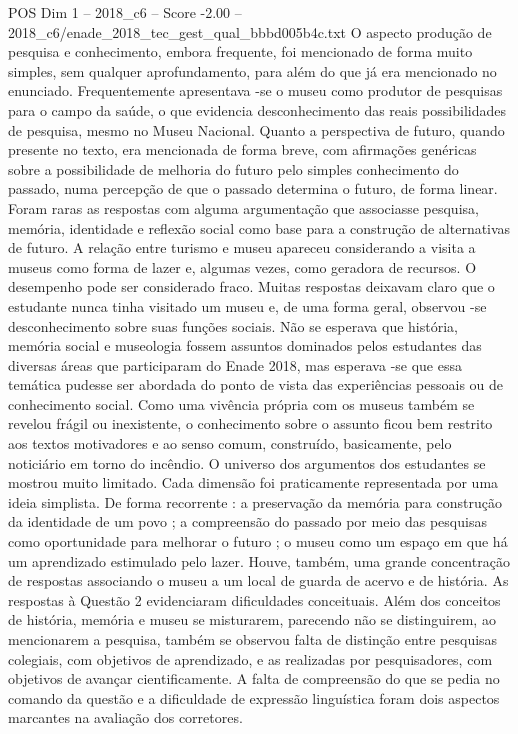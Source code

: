 \begin{textsample}{POS Dim 1 – 2018\_c6 – Score -2.00 – 2018\_c6/enade\_2018\_tec\_gest\_qual\_bbbd005b4c.txt}
O aspecto produção de pesquisa e conhecimento, embora frequente, foi mencionado de forma muito simples, sem qualquer aprofundamento, para além do que já era mencionado no enunciado.
Frequentemente apresentava -se o museu como produtor de pesquisas para o campo da saúde, o que evidencia desconhecimento das reais possibilidades de pesquisa, mesmo no Museu Nacional.
Quanto a perspectiva de futuro, quando presente no texto, era mencionada de forma breve, com afirmações genéricas sobre a possibilidade de melhoria do futuro pelo simples conhecimento do passado, numa percepção de que o passado determina o futuro, de forma linear.
Foram raras as respostas com alguma argumentação que associasse pesquisa, memória, identidade e reflexão social como base para a construção de alternativas de futuro.
A relação entre turismo e museu apareceu considerando a visita a museus como forma de lazer e, algumas vezes, como geradora de recursos.
O desempenho pode ser considerado fraco.
Muitas respostas deixavam claro que o estudante nunca tinha visitado um museu e, de uma forma geral, observou -se desconhecimento sobre suas funções sociais.
Não se esperava que história, memória social e museologia fossem assuntos dominados pelos estudantes das diversas áreas que participaram do Enade 2018, mas esperava -se que essa temática pudesse ser abordada do ponto de vista das experiências pessoais ou de conhecimento social.
Como uma vivência própria com os museus também se revelou frágil ou inexistente, o conhecimento sobre o assunto ficou bem restrito aos textos motivadores e ao senso comum, construído, basicamente, pelo noticiário em torno do incêndio.
O universo dos argumentos dos estudantes se mostrou muito limitado.
Cada dimensão foi praticamente representada por uma ideia simplista.
De forma recorrente : a preservação da memória para construção da identidade de um povo ; a compreensão do passado por meio das pesquisas como oportunidade para melhorar o futuro ; o museu como um espaço em que há um aprendizado estimulado pelo lazer.
Houve, também, uma grande concentração de respostas associando o museu a um local de guarda de acervo e de história.
As respostas à Questão 2 evidenciaram dificuldades conceituais.
Além dos conceitos de história, memória e museu se misturarem, parecendo não se distinguirem, ao mencionarem a pesquisa, também se observou falta de distinção entre pesquisas colegiais, com objetivos de aprendizado, e as realizadas por pesquisadores, com objetivos de avançar cientificamente.
A falta de compreensão do que se pedia no comando da questão e a dificuldade de expressão linguística foram dois aspectos marcantes na avaliação dos corretores.

\end{textsample}
